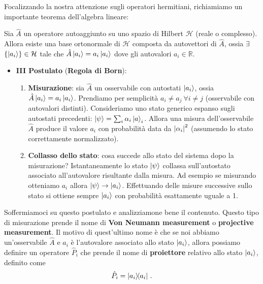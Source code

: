 \noindent Focalizzando la nostra attenzione sugli operatori hermitiani, richiamiamo un importante teorema dell'algebra lineare:
\begin{teorema}
    Sia $\hat{A}$ un operatore autoaggiunto su uno spazio di Hilbert $\mathcal{H}$ (reale o complesso). Allora esiste una base ortonormale di $\mathcal{H}$ composta da autovettori di $\hat{A}$, ossia $\exists$ $\lbrace \ket{a_i} \rbrace \in \mathcal{H}$ tale che $\hat{A} \ket{a_i} = a_i \ket{a_i}$ dove gli autovalori $a_i \in \mathbb{R}$.
\end{teorema}

\begin{itemize}
    \item \textbf{III Postulato} (\textbf{Regola di Born}):
    \begin{enumerate}
        \item \textbf{Misurazione}: sia $\hat{A}$ un osservabile con autostati $\ket{a_i}$, ossia $\hat{A} \ket{a_i} = a_i \ket{a_i}$. Prendiamo per semplicità $a_i \neq a_j \ \forall i \neq j$ (osservabile con autovalori distinti). Consideriamo uno stato generico espanso sugli autostati precedenti: $\ket \psi = \sum_i \alpha_i \ket a_i$. Allora una misura dell'osservabile $\hat{A}$ produce il valore $a_i$ con probabilità data da $\abs{\alpha_i}^2$ (assumendo lo stato correttamente normalizzato).
        
        \item \textbf{Collasso dello stato}: cosa succede allo stato del sistema dopo la misurazione? Istantaneamente lo stato $\ket \psi$ collassa sull'autostato associato all'autovalore risultante dalla misura. Ad esempio se misurando otteniamo $a_i$ allora $\ket{\psi} \rightarrow \ket{a_i}$. Effettuando delle misure successive sullo stato si ottiene sempre $\ket{a_i}$ con probabilità esattamente uguale a 1.  
    \end{enumerate}
\end{itemize}
Soffermiamoci su questo postulato e analizziamone bene il contenuto. Questo tipo di misurazione prende il nome di \textbf{Von Neumann measurement} o \textbf{projective measurement}. Il motivo di quest'ultimo nome è che se noi abbiamo un'osservabile $\hat A$ e $a_i$ è l'autovalore associato allo stato $\ket{a_i}$, allora possiamo definire un operatore $\hat P_i$ che prende il nome di \textbf{proiettore} relativo allo stato $\ket{a_i}$, definito come
\begin{equation*}
    \hat P_i=\op{a_i}{a_i} \, .
\end{equation*}
